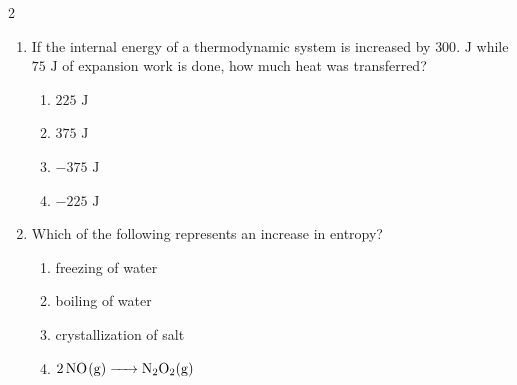 \documentclass[12pt,letterpaper]{article}
\begin{document}
\begin{multicols*}{2}
\begin{enumerate}
        \item If the internal energy of a thermodynamic system is increased by $300\text{. J}$ while $75\text{ J}$ of expansion work is done, how much heat was transferred? %
            \begin{enumerate}
                \item $225\text{ J}$
                \item $375\text{ J}$
                \item $-375\text{ J}$
                \item $-225\text{ J}$
            \end{enumerate}

        \item Which of the following represents an increase in entropy? %
            \begin{enumerate}
                \item freezing of water
                \item boiling of water
                \item crystallization of salt
                \item $\ce{2NO(g) -> N2O2(g)}$
            \end{enumerate}


\end{enumerate}
\end{multicols*}
\end{document}
